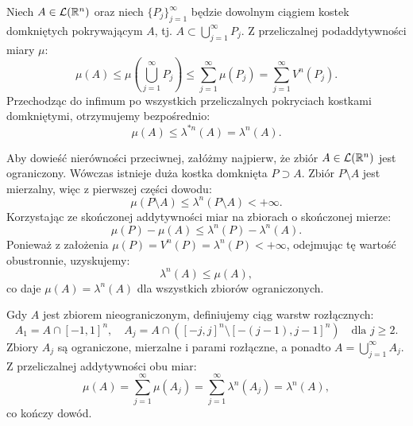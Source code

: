 \begin{dow}
    Niech $A \in \mathcal{L}({\mathbb{R}^{n}})$ oraz niech $\{P_j\}_{j=1}^\infty$ będzie dowolnym ciągiem kostek domkniętych pokrywającym $A$, tj. $A \subset \bigcup_{j=1}^\infty P_j$. Z przeliczalnej podaddytywności miary $\mu$:
    \begin{equation*}
        \mu(A) \le \mu\left(\bigcup_{j=1}^\infty P_j\right) \le \sum_{j=1}^\infty \mu(P_j) = \sum_{j=1}^\infty V^n(P_j).
    \end{equation*}
    Przechodząc do infimum po wszystkich przeliczalnych pokryciach kostkami domkniętymi, otrzymujemy bezpośrednio:
    \begin{equation*}
        \mu(A) \le \lambda^{*n}(A) = \lambda^n(A).
    \end{equation*}

    Aby dowieść nierówności przeciwnej, załóżmy najpierw, że zbiór $A \in \mathcal{L}({\mathbb{R}^{n}})$ jest ograniczony. Wówczas istnieje duża kostka domknięta $P \supset A$. Zbiór $P \setminus A$ jest mierzalny, więc z pierwszej części dowodu:
    \begin{equation*}
        \mu(P \setminus A) \le \lambda^n(P \setminus A) < +\infty.
    \end{equation*}
    Korzystając ze skończonej addytywności miar na zbiorach o skończonej mierze:
    \begin{equation*}
        \mu(P) - \mu(A) \le \lambda^n(P) - \lambda^n(A).
    \end{equation*}
    Ponieważ z założenia $\mu(P) = V^n(P) = \lambda^n(P) < +\infty$, odejmując tę wartość obustronnie, uzyskujemy:
    \begin{equation*}
        \lambda^n(A) \le \mu(A),
    \end{equation*}
    co daje $\mu(A) = \lambda^n(A)$ dla wszystkich zbiorów ograniczonych.

    Gdy $A$ jest zbiorem nieograniczonym, definiujemy ciąg warstw rozłącznych:
    \begin{equation*}
        A_1 = A \cap [-1, 1]^n, \quad A_j = A \cap \left( [-j, j]^n \setminus [-(j-1), j-1]^n \right) \quad \text{dla } j \ge 2.
    \end{equation*}
    Zbiory $A_j$ są ograniczone, mierzalne i parami rozłączne, a ponadto $A = \bigcup_{j=1}^\infty A_j$. Z przeliczalnej addytywności obu miar:
    \begin{equation*}
        \mu(A) = \sum_{j=1}^\infty \mu(A_j) = \sum_{j=1}^\infty \lambda^n(A_j) = \lambda^n(A),
    \end{equation*}
    co kończy dowód.
\end{dow}


